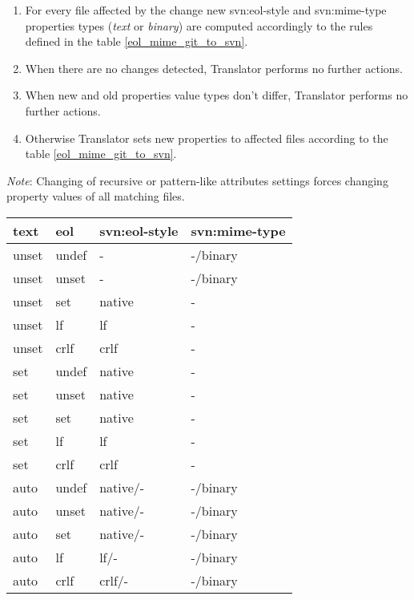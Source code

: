 \begin{enumerate}
\compactlist
\item For every file affected by the change new svn:eol-style and svn:mime-type properties types (\emph{text} or \emph{binary}) are computed accordingly to the rules defined in the table \ref{eol_mime_git_to_svn}.
\item When there are no changes detected, Translator performs no further actions.
\item When new and old properties value types don't differ, Translator performs no further actions.
\item Otherwise Translator sets new properties to affected files according to the table \ref{eol_mime_git_to_svn}.
\end{enumerate}

\emph{Note}: Changing of recursive or pattern-like attributes settings forces changing property values of all matching files.

\begin{center}
\begin{tabular}{| p{} | p{} | p{} | p{} |}
	\hline
	text  & eol      &  svn:eol-style  &  svn:mime-type \\ \hline \hline
	unset & undef    &  -              &  -/binary \footnotemark[1] \\ \hline
	unset & unset    &  -              &  -/binary \\ \hline
	unset & set      &  native         &  - \footnotemark[2] \\ \hline
	unset & lf       &  lf             &  - \\ \hline
	unset & crlf     &  crlf           &  - \\ \hline
	set   & undef    &  native         &  - \\ \hline
	set   & unset    &  native         &  - \\ \hline
	set   & set      &  native         &  - \\ \hline
	set   & lf       &  lf             &  - \\ \hline
	set   & crlf     &  crlf           &  - \\ \hline
	auto  & undef    &  native/-       &  -/binary \\ \hline
	auto  & unset    &  native/-       &  -/binary \\ \hline
	auto  & set      &  native/-       &  -/binary \\ \hline
	auto  & lf       &  lf/-           &  -/binary \\ \hline
	auto  & crlf     &  crlf/-         &  -/binary \\ \hline
\end{tabular}
\label{eol_mime_git_to_svn}
\end{center}

